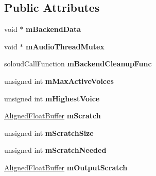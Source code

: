 \subsection*{Public Attributes}
\begin{DoxyCompactItemize}
\item 
\mbox{\label{class_so_loud_1_1_soloud_a2a3c5a468a6cc39130c42ff3f7e67ed7}} 
void $\ast$ {\bfseries m\+Backend\+Data}
\item 
\mbox{\label{class_so_loud_1_1_soloud_a6bb9b906b4432ebcca84091c27eb374f}} 
void $\ast$ {\bfseries m\+Audio\+Thread\+Mutex}
\item 
\mbox{\label{class_so_loud_1_1_soloud_a2ab636beed7b2fe5d60424339a05874d}} 
soloud\+Call\+Function {\bfseries m\+Backend\+Cleanup\+Func}
\item 
\mbox{\label{class_so_loud_1_1_soloud_ac519d07bb7442f7591502f214af635a3}} 
unsigned int {\bfseries m\+Max\+Active\+Voices}
\item 
\mbox{\label{class_so_loud_1_1_soloud_ad2993a824d6c9149e6448209f2c7fa9d}} 
unsigned int {\bfseries m\+Highest\+Voice}
\item 
\mbox{\label{class_so_loud_1_1_soloud_ac7c9967946184c12706a3e70774d9808}} 
\mbox{\hyperlink{class_so_loud_1_1_aligned_float_buffer}{Aligned\+Float\+Buffer}} {\bfseries m\+Scratch}
\item 
\mbox{\label{class_so_loud_1_1_soloud_a4628c0226d4d04fc0a5cd5c1f52410d9}} 
unsigned int {\bfseries m\+Scratch\+Size}
\item 
\mbox{\label{class_so_loud_1_1_soloud_adcc23465b671bfba16ca902b6abf0e0c}} 
unsigned int {\bfseries m\+Scratch\+Needed}
\item 
\mbox{\label{class_so_loud_1_1_soloud_ab55d9d6d6c5c1fa3a722b86a313ca3b4}} 
\mbox{\hyperlink{class_so_loud_1_1_aligned_float_buffer}{Aligned\+Float\+Buffer}} {\bfseries m\+Output\+Scratch}
\item 
\mbox{\label{class_so_loud_1_1_soloud_a931cbaf9ce4c19817a306e90c953a3b1}} 

\end{DoxyCompactItemize}

